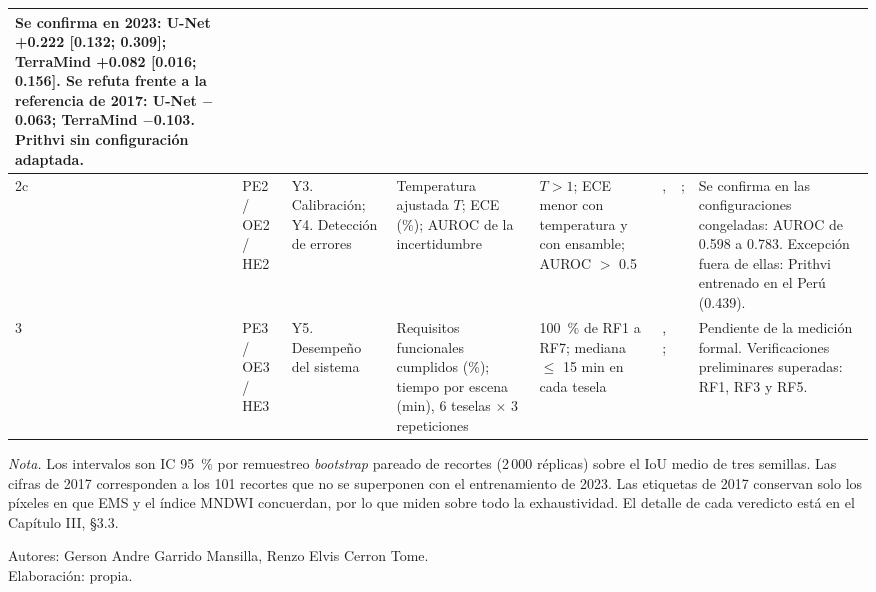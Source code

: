\documentclass[10pt]{article}
\newcommand{\ingles}[1]{\textit{#1}}
\newcommand{\autores}{Gerson Andre Garrido Mansilla, Renzo Elvis Cerron Tome}
\begin{document}
{\begin{longtable}{|L{0.8cm}|L{1.3cm}|L{2.2cm}|L{4.1cm}|L{3.2cm}|L{3.8cm}|L{4.0cm}|L{5.0cm}|}
Se confirma en 2023: U-Net +0.222 [0.132; 0.309]; TerraMind +0.082 [0.016; 0.156]. Se refuta frente
a la referencia de 2017: U-Net $-$0.063; TerraMind $-$0.103. Prithvi sin configuración
adaptada. \\ \hline
2c & PE2 / OE2 / HE2 & Y3. Calibración; Y4. Detección de errores &
Temperatura ajustada $T$; ECE (\%); AUROC de la incertidumbre &
$T > 1$; ECE menor con temperatura y con ensamble; AUROC $>$ 0.5 &
,  &
;  &
Se confirma en las configuraciones congeladas: AUROC de 0.598 a 0.783. Excepción fuera de ellas:
Prithvi entrenado en el Perú (0.439). \\  & PE3 / OE3 / HE3 & Y5. Desempeño del sistema &
Requisitos funcionales cumplidos (\%); tiempo por escena (min), 6 teselas $\times$ 3 repeticiones &
100~\% de RF1 a RF7; mediana $\leq$ 15 min en cada tesela &
, ;
 &
 &
Pendiente de la medición formal. Verificaciones preliminares superadas: RF1, RF3 y RF5. \\ \hline
\end{longtable}}

\textit{Nota.} Los intervalos son IC 95~\% por remuestreo \ingles{bootstrap} pareado de recortes
(2\,000 réplicas) sobre el IoU medio de tres semillas. Las cifras de 2017 corresponden a los 101
recortes que no se superponen con el entrenamiento de 2023. Las etiquetas de 2017 conservan solo
los píxeles en que EMS y el índice MNDWI concuerdan, por lo que miden sobre todo la exhaustividad.
El detalle de cada veredicto está en el Capítulo III, §3.3.

Autores: \autores.\\
Elaboración: propia.
\end{document}
